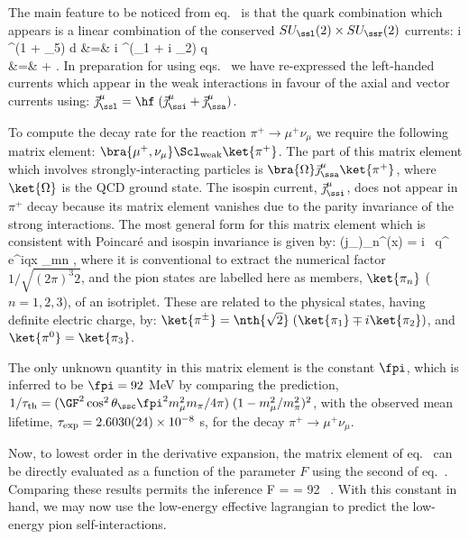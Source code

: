 \documentclass[12pt,epsf]{report}
\begin{document}
The main feature to be noticed from 
eq.~ is that the quark combination
which appears is a linear combination of the conserved
$SU_\ssl(2) 
\times SU_\ssr(2)$ currents:
%
\bg
\label{wkcurrentreln}
i \ubr \gamma^\mu (1 + \gamma_5) d &=&
 i \qbr \gamma^\mu \Pl (\tau_1 + i \tau_2)
\; q \nn\\
&=&  
+  .
\nd
%
In preparation for using eqs.~ we have
re-expressed the left-handed currents which appear in the
weak interactions in favour of the axial and vector
currents using: 
$\vec \jmath^\mu_\ssl = \hf \;( \vec \jmath^\mu_\ssi + \vec 
\jmath^\mu_\ssa)$.

To compute the decay rate for the reaction $\pi^+ \to \mu^+ 
\nu_\mu$ we require the following matrix element:
$\bra{\mu^+, 
\nu_\mu} \Scl_{\rm weak} \ket{\pi^+}$. The part of this
matrix element which involves strongly-interacting
particles is 
$\bra{\Omega} \vec \jmath^\mu_\ssa \ket{\pi^+}$, where 
$\ket{\Omega}$ is the QCD ground state. The isospin
current, 
$\vec \jmath^\mu_\ssi$, does not appear in $\pi^+$ decay
because its matrix element vanishes due to the parity
invariance of the strong interactions. The most general
form for this matrix element which is consistent with
Poincar\'e and isospin invariance is given by:
%
\eq
\label{pionmatrixelement}
\bra{\Omega} (j_\ssa)_n^\mu(x) 
 = {i \fpi \, q^\mu \; e^{iqx}
\over {}} \; \delta_{mn} ,  \eeq
%
where it is conventional to extract the numerical factor
$1/\sqrt{(2 \pi)^3 2}$, and the pion states are labelled
here as members, 
$\ket{\pi_n}$ ($n=1,2,3$), of an isotriplet. These are
related to the physical states, having definite electric
charge, by: 
$\ket{\pi^\pm} = \nth{\sqrt{2}} \; ( \ket{\pi_1} \mp i 
\ket{\pi_2})$, and $\ket{\pi^0} = \ket{\pi_3}$.

The only unknown quantity in this matrix element is the
constant $\fpi$, which is inferred to be $\fpi = 92$ MeV by
comparing the prediction, $1/\tau_{\rm th} = (\GF^2
\cos^2\theta_\ssc \fpi^2 m_\mu^2 m_\pi/4 \pi) \; 
(1 - m_\mu^2 / m_\pi^2)^2$, with the observed mean 
lifetime, $\tau_{\rm exp} = 2.6030(24) \times 
10^{-8}$ s, for the decay $\pi^+ \to \mu^+ \nu_\mu$.

Now, to lowest order in the derivative expansion, the
matrix element of eq.~ can be
directly evaluated as a function of the parameter $F$ using
the second of  eq.~. Comparing these 
results permits the inference
%
\eq
\label{thevalueforf}
F = \fpi = 92 \, \MeV.
\eeq
%
With this constant in hand, we may now use the low-energy
effective lagrangian to predict the low-energy pion
self-interactions.
\end{document}
